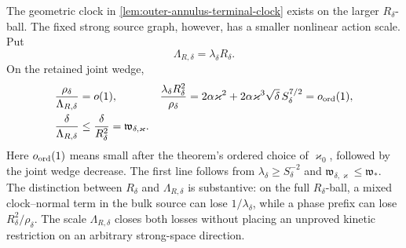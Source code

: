 The geometric clock in \cref{lem:outer-annulus-terminal-clock} exists on
the larger \(R_\delta\)-ball.  The fixed strong source graph, however,
has a smaller nonlinear action scale.  Put
\begin{equation}
 \Lambda_{R,\delta}=\lambda_\delta R_\delta.     \label{eq:outer-clock-action-scale}
\end{equation}
On the retained joint wedge,
\begin{align}
 \frac{\rho_\delta}{\Lambda_{R,\delta}}&=o(1),&
 \frac{\lambda_\delta R_\delta^2}{\rho_\delta}
 &=2\alpha\varkappa^2
   +2\alpha\varkappa^3\sqrt\delta\,S_\delta^{7/2}=o_{\rm ord}(1),
                                                        \notag\\
 \frac{\delta}{\Lambda_{R,\delta}}
 &\le\frac{\delta}{R_\delta^2}
   =\mathfrak w_{\delta,\varkappa}.              \label{eq:outer-clock-action-scale-ledger}
\end{align}
Here \(o_{\rm ord}(1)\) means small after the theorem's ordered choice of
\(\varkappa_0\), followed by the joint wedge decrease.  The first line
follows from \(\lambda_\delta\ge S_\delta^{-2}\) and
\(\mathfrak w_{\delta,\varkappa}\le\mathfrak w_*\).
The distinction between \(R_\delta\) and \(\Lambda_{R,\delta}\) is
substantive: on the full \(R_\delta\)-ball, a mixed clock--normal term in
the bulk source can lose \(1/\lambda_\delta\), while a phase prefix can
lose \(R_\delta^2/\rho_\delta\).  The scale
\(\Lambda_{R,\delta}\) closes both losses without placing an unproved
kinetic restriction on an arbitrary strong-space direction.

